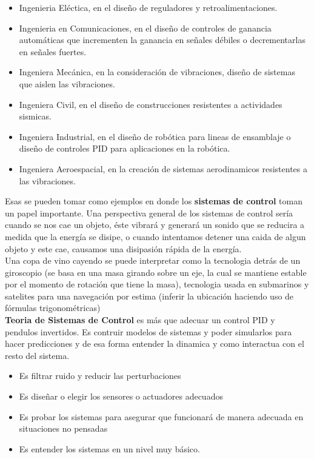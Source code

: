 \documentclass[
	12pt, %
]{fphw}
\begin{document}
\begin{itemize}
\item Ingenieria Eléctica, en el diseño de reguladores y retroalimentaciones.
\item Ingenieria en Comunicaciones, en el diseño de controles de ganancia automáticas que incrementen la ganancia en señales débiles o decrementarlas en señales fuertes.
\item Ingeniera Mecánica, en la consideración de vibraciones, diseño de sistemas que aislen las vibraciones. 
\item Ingeniera Civil, en el diseño de construcciones resistentes a actividades sismicas.
\item Ingeniera Industrial, en el diseño de robótica para lineas de ensamblaje o diseño de controles PID para aplicaciones en la robótica.
\item Ingeniera Aeroespacial, en la creación de sistemas aerodinamicos resistentes a las vibraciones.
\end{itemize}

Esas se pueden tomar como ejemplos en donde los \textbf{sistemas de control} toman un papel importante. Una perspectiva general de los sistemas de control sería cuando se nos cae un objeto, éste vibrará y generará un sonido que se reducira a medida que la energía se disipe, o cuando intentamos detener una caida de algun objeto y este cae, causamos una disipasión rápida de la energía. \\

Una copa de vino cayendo se puede interpretar como la tecnologia detrás de un giroscopio (se basa en una masa girando sobre un eje, la cual se mantiene estable por el momento de rotación que tiene la masa), tecnologia usada en submarinos y satelites para una navegación por estima (inferir la ubicación haciendo uso de fórmulas trigonométricas)\\

\textbf{Teoria de Sistemas de Control} es más que adecuar un control PID y pendulos invertidos. Es contruir modelos de sistemas y poder simularlos para hacer predicciones y de esa forma entender la dinamica y como interactua con el resto del sistema.

\begin{itemize}
\item Es filtrar ruido y reducir las perturbaciones
\item Es diseñar o elegir los sensores o actuadores adecuados
\item Es probar los sistemas para asegurar que funcionará de manera adecuada en situaciones no pensadas
\item Es entender los sistemas en un nivel muy básico.
\end{itemize}
\end{document}
